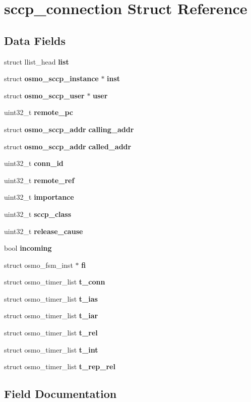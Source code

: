 \section{sccp\+\_\+connection Struct Reference}
\label{structsccp__connection}
\subsection*{Data Fields}
\begin{DoxyCompactItemize}
\item 
struct llist\+\_\+head {\bf list}
\item 
struct {\bf osmo\+\_\+sccp\+\_\+instance} $\ast$ {\bf inst}
\item 
struct {\bf osmo\+\_\+sccp\+\_\+user} $\ast$ {\bf user}
\item 
uint32\+\_\+t {\bf remote\+\_\+pc}
\item 
struct {\bf osmo\+\_\+sccp\+\_\+addr} {\bf calling\+\_\+addr}
\item 
struct {\bf osmo\+\_\+sccp\+\_\+addr} {\bf called\+\_\+addr}
\item 
uint32\+\_\+t {\bf conn\+\_\+id}
\item 
uint32\+\_\+t {\bf remote\+\_\+ref}
\item 
uint32\+\_\+t {\bf importance}
\item 
uint32\+\_\+t {\bf sccp\+\_\+class}
\item 
uint32\+\_\+t {\bf release\+\_\+cause}
\item 
bool {\bf incoming}
\item 
struct osmo\+\_\+fsm\+\_\+inst $\ast$ {\bf fi}
\item 
struct osmo\+\_\+timer\+\_\+list {\bf t\+\_\+conn}
\item 
struct osmo\+\_\+timer\+\_\+list {\bf t\+\_\+ias}
\item 
struct osmo\+\_\+timer\+\_\+list {\bf t\+\_\+iar}
\item 
struct osmo\+\_\+timer\+\_\+list {\bf t\+\_\+rel}
\item 
struct osmo\+\_\+timer\+\_\+list {\bf t\+\_\+int}
\item 
struct osmo\+\_\+timer\+\_\+list {\bf t\+\_\+rep\+\_\+rel}
\end{DoxyCompactItemize}


\subsection{Field Documentation}
